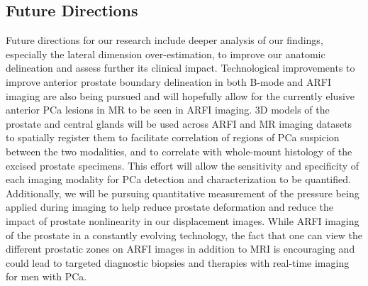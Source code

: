 \subsection{Future Directions}
Future directions for our research include deeper analysis of our findings,
especially the lateral dimension over-estimation, to improve our anatomic
delineation and assess further its clinical impact.  Technological improvements
to improve anterior prostate boundary delineation in both B-mode and ARFI
imaging are also being pursued and will hopefully allow for the currently
elusive anterior PCa lesions in MR to be seen in ARFI imaging.  3D models of
the prostate and central glands will be used across ARFI and MR imaging
datasets to spatially register them to facilitate correlation of regions of PCa
suspicion between the two modalities, and to correlate with whole-mount
histology of the excised prostate specimens.  This effort will allow the
sensitivity and specificity of each imaging modality for PCa detection and
characterization to be quantified.  Additionally, we will be pursuing
quantitative measurement of the pressure being applied during imaging to help
reduce prostate deformation and reduce the impact of prostate nonlinearity in
our displacement images.  While ARFI imaging of the prostate in a constantly
evolving technology, the fact that one can view the different prostatic zones
on ARFI images in addition to MRI is encouraging and could lead to targeted
diagnostic biopsies and therapies with real-time imaging for men with PCa. 

